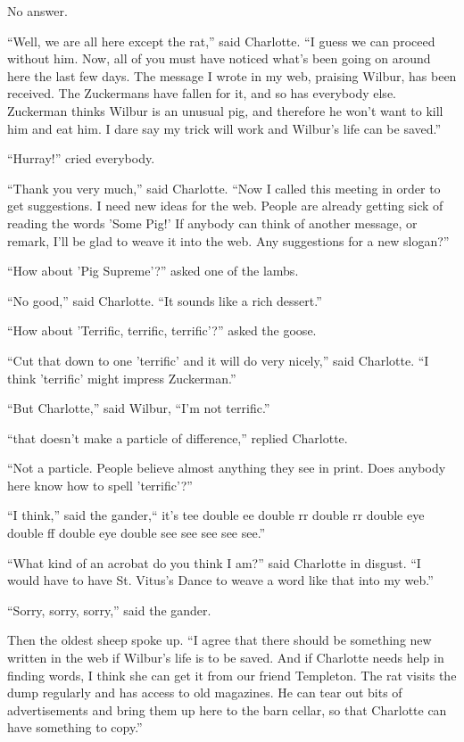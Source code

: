 \documentclass[a4paper, oneside]{book}
\begin{document}
No answer.

``Well, we are all here except the rat,'' said Charlotte. ``I guess we
can proceed without him. Now, all of you must have noticed what's
been going on around here the last few days. The message I wrote
in my web, praising Wilbur, has been received. The Zuckermans
have fallen for it, and so has everybody else. Zuckerman thinks
Wilbur is an unusual pig, and therefore he won't want to kill him
and eat him. I dare say my trick will work and Wilbur's life can be
saved.''

``Hurray!'' cried everybody.

``Thank you very much,'' said Charlotte. ``Now I called this
meeting in order to get suggestions. I need new ideas for the web.
People are already getting sick of reading the words 'Some Pig!' If
anybody can think of another message, or remark, I'll be glad to
weave it into the web. Any suggestions for a new slogan?''

``How about 'Pig Supreme'?'' asked one of the lambs.

``No good,'' said Charlotte. ``It sounds like a rich dessert.''

``How about 'Terrific, terrific, terrific'?'' asked the goose.

``Cut that down to one 'terrific' and it will do very nicely,'' said
Charlotte. ``I think 'terrific' might impress Zuckerman.''

``But Charlotte,'' said Wilbur, ``I'm not terrific.''

``that doesn't make a particle of difference,'' replied Charlotte.

``Not a particle. People believe almost anything they see in print.
Does anybody here know how to spell 'terrific'?''

``I think,'' said the gander,`` it's tee double ee double rr double rr
double eye double ff double eye double see see see see see.''

``What kind of an acrobat do you think I am?'' said Charlotte in
disgust. ``I would have to have St. Vitus's Dance to weave a word
like that into my web.''

``Sorry, sorry, sorry,'' said the gander.

Then the oldest sheep spoke up. ``I agree that there should be
something new written in the web if Wilbur's life is to be saved.
And if Charlotte needs help in finding words, I think she can get it
from our friend Templeton. The rat visits the dump regularly and
has access to old magazines. He can tear out bits of advertisements
and bring them up here to the barn cellar, so that Charlotte can
have something to copy.''
\end{document}
